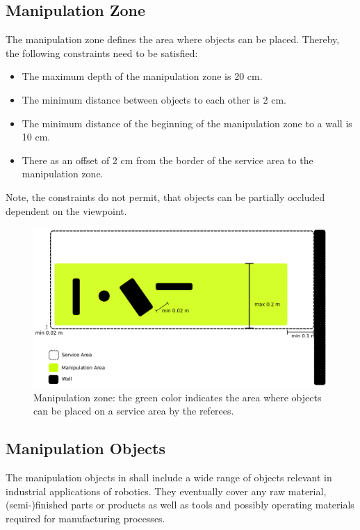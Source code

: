 \subsection{Manipulation Zone} \label{ssec:ManipulationZone}
The manipulation zone defines the area where objects can be placed. Thereby, the following constraints need to be satisfied:
\begin{itemize}
	\item The maximum depth of the manipulation zone is 20 cm.
	\item The minimum distance between objects to each other is 2 cm.
	\item The minimum distance of the beginning of the manipulation zone to a wall is 10 cm.
	\item There as an offset of 2 cm from the border of the service area to the manipulation zone.
\end{itemize}
Note, the constraints do not permit, that objects can be partially occluded dependent on the viewpoint.
\begin{figure} [h!]
\centering
\includegraphics[width=1.0\textwidth ]{./images/manipulation_zone.pdf}
\caption{Manipulation zone: the green color indicates the area where objects can be placed on a service area by the referees.}
\label{fig:manipulation_zone}
\end{figure}


\subsection{Manipulation Objects} \label{ssec:ManipulationObjects}
The manipulation objects in \RCAW shall include a wide range of objects relevant in industrial applications of robotics. They eventually cover any raw material, (semi-)finished parts or products as well as tools and possibly operating materials required for manufacturing processes.
\par

